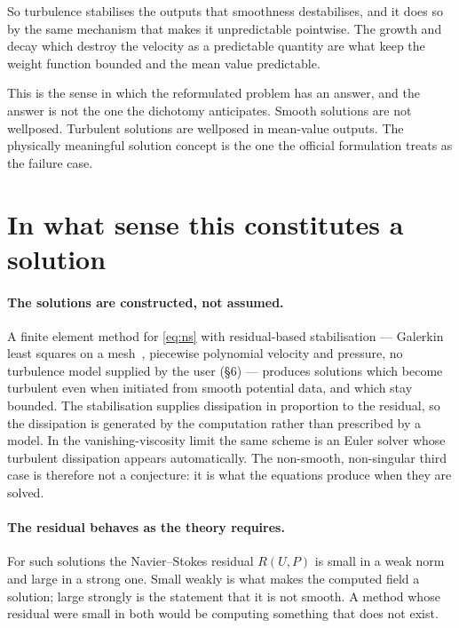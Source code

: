 \documentclass[11pt]{article}
\begin{document}
So turbulence stabilises the outputs that smoothness destabilises, and it does so by the same
mechanism that makes it unpredictable pointwise. The growth and decay which destroy the velocity as a
predictable quantity are what keep the weight function bounded and the mean value predictable.

This is the sense in which the reformulated problem has an answer, and the answer is not the one the
dichotomy anticipates. Smooth solutions are not wellposed. Turbulent solutions are wellposed in
mean-value outputs. The physically meaningful solution concept is the one the official formulation
treats as the failure case.

\section{In what sense this constitutes a solution}

\paragraph{The solutions are constructed, not assumed.} A finite element method for \eqref{eq:ns}
with residual-based stabilisation --- Galerkin least squares on a mesh~\cite{fehn}, piecewise polynomial
velocity and pressure, no turbulence model supplied by the user (\S6) --- produces solutions which
become turbulent even when initiated from smooth potential data, and which stay bounded. The stabilisation
supplies dissipation in proportion to the residual, so the dissipation is generated by the
computation rather than prescribed by a model. In the vanishing-viscosity limit the same scheme is
an Euler solver whose turbulent dissipation appears automatically. The non-smooth,
non-singular third case is therefore not a conjecture: it is what the equations produce when they
are solved.

\paragraph{The residual behaves as the theory requires.} For such solutions the Navier--Stokes
residual $R(U,P)$ is small in a weak norm and large in a strong one. Small weakly is what makes the
computed field a solution; large strongly is the statement that it is not smooth. A method whose
residual were small in both would be computing something that does not exist.
\end{document}
